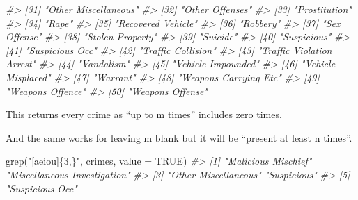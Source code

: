 \documentclass[
]{krantz}
\makeatletter
\newenvironment{Shaded}{\begin{snugshade}}{\end{snugshade}}
\newcommand{\AttributeTok}[1]{\textcolor[rgb]{0.61,0.61,0.61}{#1}}
\newcommand{\CommentTok}[1]{\textcolor[rgb]{0.37,0.37,0.37}{\textit{#1}}}
\newcommand{\ConstantTok}[1]{\textcolor[rgb]{0,0,0}{#1}}
\newcommand{\FunctionTok}[1]{\textcolor[rgb]{0,0,0}{#1}}
\newcommand{\NormalTok}[1]{#1}
\newcommand{\StringTok}[1]{\textcolor[rgb]{0.5,0.5,0.5}{#1}}
\newenvironment{kframe}{%
\medskip{}
\setlength{\fboxsep}{.8em}
 \def\at@end@of@kframe{}%
 \ifinner\ifhmode%
  \def\at@end@of@kframe{\end{minipage}}%
  \begin{minipage}{\columnwidth}%
 \fi\fi%
 \def\FrameCommand##1{\hskip\@totalleftmargin \hskip-\fboxsep
 \colorbox{shadecolor}{##1}\hskip-\fboxsep
     \hskip-\linewidth \hskip-\@totalleftmargin \hskip\columnwidth}%
 \MakeFramed {\advance\hsize-\width
   \@totalleftmargin\z@ \linewidth\hsize
   \@setminipage}}%
 {\par\unskip\endMakeFramed%
 \at@end@of@kframe}
\renewenvironment{Shaded}{\begin{kframe}}{\end{kframe}}
\makeatother
\begin{document}
\begin{Shaded}
\begin{Highlighting}[]
\CommentTok{\#\textgreater{} [31] "Other Miscellaneous"                       }
\CommentTok{\#\textgreater{} [32] "Other Offenses"                            }
\CommentTok{\#\textgreater{} [33] "Prostitution"                              }
\CommentTok{\#\textgreater{} [34] "Rape"                                      }
\CommentTok{\#\textgreater{} [35] "Recovered Vehicle"                         }
\CommentTok{\#\textgreater{} [36] "Robbery"                                   }
\CommentTok{\#\textgreater{} [37] "Sex Offense"                               }
\CommentTok{\#\textgreater{} [38] "Stolen Property"                           }
\CommentTok{\#\textgreater{} [39] "Suicide"                                   }
\CommentTok{\#\textgreater{} [40] "Suspicious"                                }
\CommentTok{\#\textgreater{} [41] "Suspicious Occ"                            }
\CommentTok{\#\textgreater{} [42] "Traffic Collision"                         }
\CommentTok{\#\textgreater{} [43] "Traffic Violation Arrest"                  }
\CommentTok{\#\textgreater{} [44] "Vandalism"                                 }
\CommentTok{\#\textgreater{} [45] "Vehicle Impounded"                         }
\CommentTok{\#\textgreater{} [46] "Vehicle Misplaced"                         }
\CommentTok{\#\textgreater{} [47] "Warrant"                                   }
\CommentTok{\#\textgreater{} [48] "Weapons Carrying Etc"                      }
\CommentTok{\#\textgreater{} [49] "Weapons Offence"                           }
\CommentTok{\#\textgreater{} [50] "Weapons Offense"}
\end{Highlighting}
\end{Shaded}

This returns every crime as ``up to m times'' includes zero times.

And the same works for leaving m blank but it will be ``present at least n times''.

\begin{Shaded}
\begin{Highlighting}[]
\FunctionTok{grep}\NormalTok{(}\StringTok{"[aeiou]\{3,\}"}\NormalTok{, crimes, }\AttributeTok{value =} \ConstantTok{TRUE}\NormalTok{)}
\CommentTok{\#\textgreater{} [1] "Malicious Mischief"          "Miscellaneous Investigation"}
\CommentTok{\#\textgreater{} [3] "Other Miscellaneous"         "Suspicious"                 }
\CommentTok{\#\textgreater{} [5] "Suspicious Occ"}
\end{Highlighting}
\end{Shaded}
\end{document}
